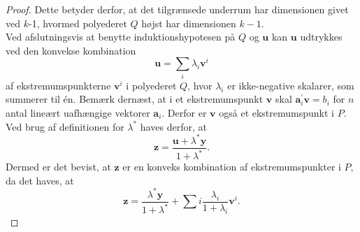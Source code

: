 \begin{proof}
Dette betyder derfor, at det tilgrænsede underrum har dimensionen givet ved $k$-1, hvormed polyederet $Q$ højst har dimensionen $k-1$. \\
Ved afslutningsvis at benytte induktionshypotesen på $Q$ og $\textbf{u}$ kan $\textbf{u}$ udtrykkes ved den konvekse kombination
$$\textbf{u}=\sum_{i}\lambda_{i}\textbf{v}^i$$
af ekstremumspunkterne $\textbf{v}^i$ i polyederet $Q$, hvor $\lambda_i$ er ikke-negative skalarer, som summerer til én. 
Bemærk dernæst, at i et ekstremumspunkt $\textbf{v}$ skal $\mathbf{a}_{i}^{'} \textbf{v}=b_{i}$ for $n$ antal lineært uafhængige vektorer $\textbf{a}_i$. 
Derfor er  $\textbf{v}$ også et ekstremumspunkt i $P$. 
Ved brug af definitionen for $\lambda^*$ haves derfor, at 
$$ \textbf{z}=\frac{\textbf{u}+\lambda^*\textbf{y}}{1+\lambda^*}.$$
Dermed er det bevist, at $\textbf{z}$ er en konveks kombination af ekstremumspunkter i $P$, da det haves, at 
$$\textbf{z}=\frac{\lambda^*\textbf{y}}{1+\lambda^*}+\sum_{}i\frac{\lambda_i}{1+\lambda_i}\textbf{v}^i.$$
\end{proof}
